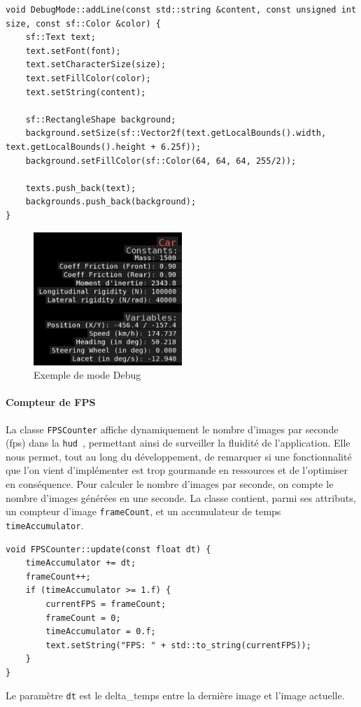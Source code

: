 \begin{lstlisting}[style=CStyle, label={lst:code_addline}]
void DebugMode::addLine(const std::string &content, const unsigned int size, const sf::Color &color) {
    sf::Text text;
    text.setFont(font);
    text.setCharacterSize(size);
    text.setFillColor(color);
    text.setString(content);

    sf::RectangleShape background;
    background.setSize(sf::Vector2f(text.getLocalBounds().width, text.getLocalBounds().height + 6.25f));
    background.setFillColor(sf::Color(64, 64, 64, 255/2));

    texts.push_back(text);
    backgrounds.push_back(background);
}
\end{lstlisting}
\begin{figure}[H]
    \centering
    \includegraphics[width=0.5\textwidth]{resources/example_debug_mode_1}
    \caption{Exemple de mode Debug}
    \label{fig:debug_mode}
\end{figure}

\paragraph{Compteur de FPS}
La classe \texttt{FPSCounter} affiche dynamiquement le nombre d'images par seconde (\gls{fps}) dans la \texttt{\gls{hud} }, permettant ainsi de surveiller la fluidité de l'application.
Elle nous permet, tout au long du développement, de remarquer si une fonctionnalité que l'on vient d'implémenter est trop gourmande en ressources et de l'optimiser en conséquence.
\textsuper
Pour calculer le nombre d'images par seconde, on compte le nombre d'images générées en une seconde.
La classe contient, parmi ses attributs, un compteur d'image \texttt{frameCount}, et un accumulateur de temps \texttt{timeAccumulator}.
\begin{lstlisting}[style=CStyle, label={lst:code_fpscounter}]
void FPSCounter::update(const float dt) {
    timeAccumulator += dt;
    frameCount++;
    if (timeAccumulator >= 1.f) {
        currentFPS = frameCount;
        frameCount = 0;
        timeAccumulator = 0.f;
        text.setString("FPS: " + std::to_string(currentFPS));
    }
}
\end{lstlisting}
Le paramètre \texttt{dt} est le \gls{delta_temps} entre la dernière image et l'image actuelle.

